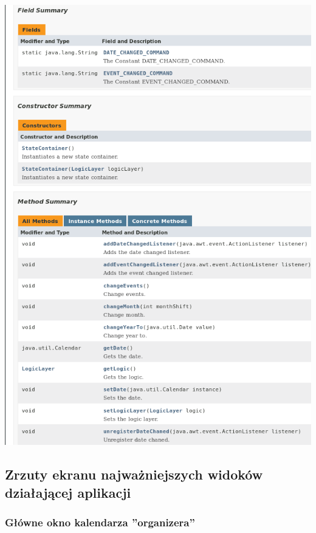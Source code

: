 \documentclass[a4paper,12pt]{article}
\begin{document}
\begin{minipage}{.75\textwidth}

    \includegraphics[width=\textwidth]{./screen/GUI/stateContainer.png}
    \label{MainViewLinux}

\end{minipage}

\subsection{Zrzuty ekranu najważniejszych widoków działającej aplikacji}
\subsubsection{Główne okno kalendarza ''organizera''}
\end{document}
